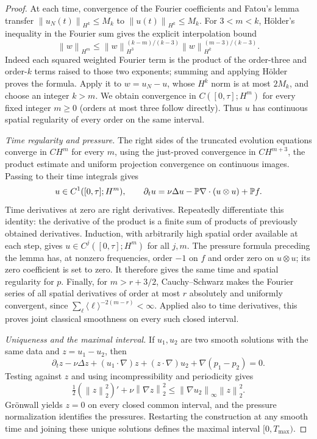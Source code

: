\documentclass[11pt,a4paper]{article}
\theoremstyle{definition}\newtheorem{definition}[theorem]{Definition}
\theoremstyle{remark}\newtheorem{remark}[theorem]{Remark}
\newcommand{\norm}[1]{\left\lVert#1\right\rVert}
\begin{document}
\begin{proof}
At each time, convergence of the Fourier coefficients and Fatou's lemma
transfer $\norm{u_N(t)}_{H^k}\le M_k$ to
$\norm{u(t)}_{H^k}\le M_k$. For $3<m<k$, H\"older's inequality in the
Fourier sum gives the explicit interpolation bound
\[
 \norm{w}_{H^m}
 \le\norm{w}_{H^3}^{(k-m)/(k-3)}
       \norm{w}_{H^k}^{(m-3)/(k-3)}.
\]
Indeed each squared weighted Fourier term is the product of the
order-three and order-$k$ terms raised to those two exponents; summing and
applying H\"older proves the formula. Apply it to $w=u_N-u$, whose $H^k$
norm is at most $2M_k$, and choose an integer $k>m$. We obtain convergence in
$C([0,\tau];H^m)$ for every fixed integer $m\ge0$ (orders at most three
follow directly). Thus $u$ has continuous spatial regularity of every order
on the same interval.

\emph{Time regularity and pressure.}
The right sides of the truncated evolution equations converge in
$C H^m$ for every $m$, using the just-proved convergence in $C H^{m+3}$,
the product estimate and uniform projection convergence on continuous
images. Passing to their time integrals gives
\[
 u\in C^1([0,\tau];H^m),\qquad
 \partial_tu=\nu\Delta u-\mathbb P\nabla\cdot(u\otimes u)+\mathbb P f.
\]
Time derivatives at zero are right derivatives. Repeatedly differentiate
this identity: the derivative of the product is a finite sum of products
of previously obtained derivatives. Induction, with arbitrarily high
spatial order available at each step, gives
$u\in C^j([0,\tau];H^m)$ for all $j,m$.
The pressure formula preceding the lemma has, at nonzero frequencies,
order $-1$ on $f$ and order zero on $u\otimes u$; its zero coefficient is
set to zero. It therefore gives the same time and spatial regularity for
$p$. Finally, for $m>r+3/2$, Cauchy--Schwarz makes the Fourier series of
all spatial derivatives of order at most $r$ absolutely and uniformly
convergent, since
$\sum_\ell\langle\ell\rangle^{-2(m-r)}<\infty$.
Applied also to time derivatives, this proves joint classical smoothness
on every such closed interval.

\emph{Uniqueness and the maximal interval.}
If $u_1,u_2$ are two smooth solutions with the same data and $z=u_1-u_2$,
then
\[
 \partial_tz-\nu\Delta z+(u_1\cdot\nabla)z
 +(z\cdot\nabla)u_2+\nabla(p_1-p_2)=0.
\]
Testing against $z$ and using incompressibility and periodicity gives
\[
 \tfrac12(\norm{z}_2^2)'+\nu\norm{\nabla z}_2^2
 \le\norm{\nabla u_2}_\infty\norm{z}_2^2.
\]
Gr\"onwall yields $z=0$ on every closed common interval, and the pressure
normalization identifies the pressures. Restarting the construction at
any smooth time and joining these unique solutions defines the maximal
interval $[0,T_{\max})$.


\end{proof}
\end{document}
